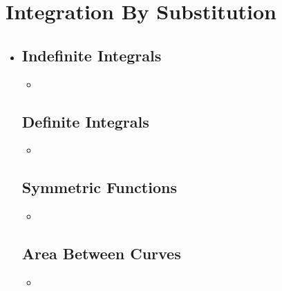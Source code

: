 \section{Integration By Substitution}
\begin{itemize}
  \item []
  
  \subsection{Indefinite Integrals}
  \begin{itemize}
    \item 
  \end{itemize}

  \subsection{Definite Integrals}
  \begin{itemize}
    \item 
  \end{itemize}

  \subsection{Symmetric Functions}
  \begin{itemize}
    \item 
  \end{itemize}

  \subsection{Area Between Curves}
  \begin{itemize}
    \item 
  \end{itemize}
  
\end{itemize}



